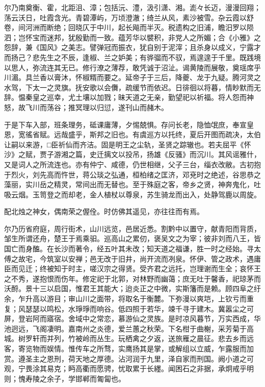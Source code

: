 \documentclass[12pt,UTF8]{ctexbook}
\begin{document}
尔乃南奠衡、霍，北距沮、漳；包括沅、澧，汲引潇、湘。滮々长迈，漫漫回翔；荡云沃日，吐霞含光。青碧潭屿，万顷澄澈；绮兰从风，素沙被雪。杂云霞以舒卷，间河洲而断绝；回晓仄于中川，起长飚而半灭。税遗构之旧浦，瞻汨罗以陨泗；岂怀宝而迷邦，犹殷勤而一致。蕴芳华以襞积，非党人之所媚；合《小雅》之怨辞，兼《国风》之美志。譬弹冠而振衣，犹自别于泥滓；且杀身以成义，宁露才而扬己？悲先生之不辰，逢椒、兰之妒美；有骅骝而不驭，焉遑遑于千里。既践境以思人，弥流连其无已。修行潦之薄荐，敢凭诚于沼沚。谒黄陵而展敬，奠瑶席乎川湄。具兰香以膏沐，怀椒糈而要之。延帝子于三后，降夔、龙于九疑。腾河灵之水驾，下太一之灵旗。抚安歌以会儛，疏缓节而依迟。日徘徊以将暮，情眇默而无辞。愠秦皇之巡幸，尤土壤以加戮；昧天道之无亲，勤望祀以祈福。将人怨而神怒，故飞川而荡谷；推冥理以归愆，遂刊山而赭木。

于是下车入部，班条理务，砥课庸薄，夕惕兢惧。存问长老，隐恤氓庶，奉宣皇恩，宽徭省赋。远哉盛乎，斯邦之旧也。有虞巡方以托终，夏后开图而疏决，太伯让嗣以来游，□臣祈仙而齐洁。固是明王之尘轨，圣贤之踪辙也。若夫屈平《怀沙》之赋，贾子游湘之篇，史迁摛文以投吊，扬雄《反骚》而沉川。其风谣雅什，又是词人之所流连也。亦有仲宁、咸德，仍世相继，父子三台，缁衣改敝。古初抱于烈火，刘先高而忤世，蒋公琰之弘通，桓柏绪之匡济，邓兗时之绝述，谷思恭之藻丽，实川岳之精灵，常间出而无替也。至于殊庭之客，帝乡之贤，神奔鬼化，吐吸云烟。玉笥登之而却老，金人植杖以尊泉，苏生骑龙而出入，处静驾鹿以周旋。

配北烛之神女，偶南荣之偓佺。时仿佛其遥见，亦往往而有焉。

尔乃历省府庭，周行街术，山川远览，邑居近悉。割黔中以置守，献青阳而背质，邹生所谓还舟，楚王于焉乘驲。巡高山之累仞，褒吴文之为宰；彼非刘而八王，皆国亡而身醢。在长沙而著令，经五叶其未改；知天道之福谦，胜一时之经始。寻太傅之故宅，今筑室以安禅；邑无改于旧井，尚开流而冽泉。怀伊、管之政术，遇庸臣而见迁；终被知于时主，嗟汉宗之得贤。受齐君之远托，岂理谢而生全；哀怀王之不秀，遂抱恨而伤年。修定祀于北郭，对林野而幽蔼；庶无吐于馨香，祀琼茅而沃酹。景十三以启国，惟君王其能大；迨炎正之中微，实斯籓而是赖。顾四阜之纡余，乍升高以游目；审山川之面带，将取名于衡麓。下弥漫以爽垲，上钦亏而重复；风瑟瑟以鸣松，水琤琤而响谷。低四照于若华，竦千寻于建木。冀嚣尘之可屏，登岩阿而寤宿。舍域中之常恋，慕游仙之灵族。是时凉风暮节，万实西成，华池迥远，飞阁凄明。嘉南州之炎德，爱兰蕙之秋荣。下名柑于曲榭，采芳菊于高城。树罗轩而并列，竹被岭而丛生。玩栖禽之夕返，送旅雁之晨征。悲去乡而远客，寄览物而娱情。惟传车之所骛，实鹰扬其是掌，或解组以立威，乍露服而加赏。遵圣主之恩刑，荷天地之厚德。沾河润于九里，泽自家而刑国。阙小道之可观，宁畏涂其易克；眄高衢而愿骋，忧取累于长纆。闻困石之非据，承炯戒乎明则；愧寿陵之余子，学邯郸而匍匐也。
\end{document}
